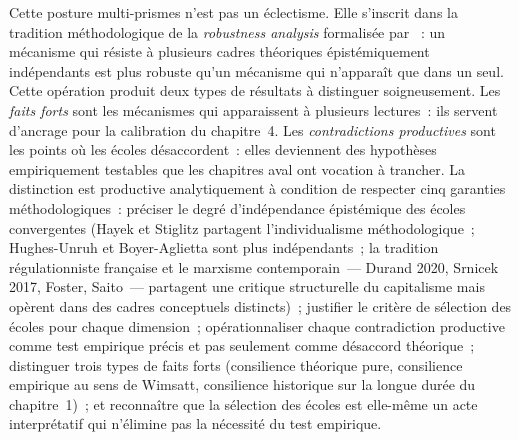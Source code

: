 Cette posture multi-prismes n'est pas un éclectisme. Elle s'inscrit dans la tradition méthodologique de la \emph{robustness analysis} formalisée par \textcite{wimsatt_robustness_1981}~: un mécanisme qui résiste à plusieurs cadres théoriques épistémiquement indépendants est plus robuste qu'un mécanisme qui n'apparaît que dans un seul. Cette opération produit deux types de résultats à distinguer soigneusement. Les \emph{faits forts} sont les mécanismes qui apparaissent à plusieurs lectures~: ils servent d'ancrage pour la calibration du chapitre~4. Les \emph{contradictions productives} sont les points où les écoles désaccordent~: elles deviennent des hypothèses empiriquement testables que les chapitres aval ont vocation à trancher. La distinction est productive analytiquement à condition de respecter cinq garanties méthodologiques~: préciser le degré d'indépendance épistémique des écoles convergentes (Hayek et Stiglitz partagent l'individualisme méthodologique~; Hughes-Unruh et Boyer-Aglietta sont plus indépendants~; la tradition régulationniste française et le marxisme contemporain~--- Durand 2020, Srnicek 2017, Foster, Saito~--- partagent une critique structurelle du capitalisme mais opèrent dans des cadres conceptuels distincts)~; justifier le critère de sélection des écoles pour chaque dimension~; opérationnaliser chaque contradiction productive comme test empirique précis et pas seulement comme désaccord théorique~; distinguer trois types de faits forts (consilience théorique pure, consilience empirique au sens de Wimsatt, consilience historique sur la longue durée du chapitre~1)~; et reconnaître que la sélection des écoles est elle-même un acte interprétatif qui n'élimine pas la nécessité du test empirique.

